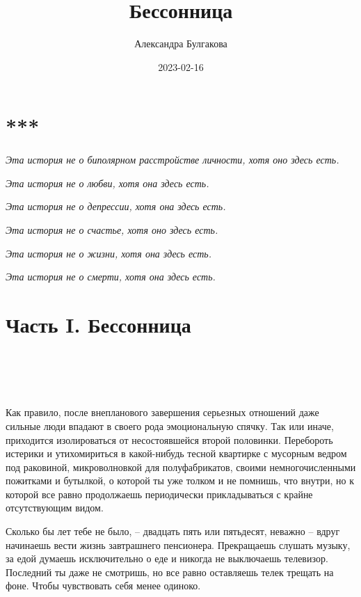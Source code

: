 \documentclass[
]{book}
\title{Бессонница}
\author{Александра Булгакова}
\date{2023-02-16}
\begin{document}
\maketitle

{
\setcounter{tocdepth}{1}
\tableofcontents
}
\hypertarget{section}{%
\chapter*{***}\label{section}}

\emph{Эта история не о биполярном расстройстве личности, хотя оно здесь есть.}

\emph{Эта история не о любви, хотя она здесь есть.}

\emph{Эта история не о депрессии, хотя она здесь есть.}

\emph{Эта история не о счастье, хотя оно здесь есть.}

\emph{Эта история не о жизни, хотя она здесь есть.}

\emph{Эта история не о смерти, хотя она здесь есть.}

\hypertarget{ux447ux430ux441ux442ux44c-i.-ux431ux435ux441ux441ux43eux43dux43dux438ux446ux430}{%
\chapter*{Часть I. Бессонница}\label{ux447ux430ux441ux442ux44c-i.-ux431ux435ux441ux441ux43eux43dux43dux438ux446ux430}}

\hypertarget{chapter-1}{%
\chapter{~}\label{chapter-1}}

Как правило, после внепланового завершения серьезных отношений даже сильные люди впадают в своего рода эмоциональную спячку. Так или иначе, приходится изолироваться от несостоявшейся второй половинки. Перебороть истерики и утихомириться в какой-нибудь тесной квартирке с мусорным ведром под раковиной, микроволновкой для полуфабрикатов, своими немногочисленными пожитками и бутылкой, о которой ты уже толком и не помнишь, что внутри, но к которой все равно продолжаешь периодически прикладываться с крайне отсутствующим видом.

Сколько бы лет тебе не было, -- двадцать пять или пятьдесят, неважно -- вдруг начинаешь вести жизнь завтрашнего пенсионера. Прекращаешь слушать музыку, за едой думаешь исключительно о еде и никогда не выключаешь телевизор. Последний ты даже не смотришь, но все равно оставляешь телек трещать на фоне. Чтобы чувствовать себя менее одиноко.
\end{document}
